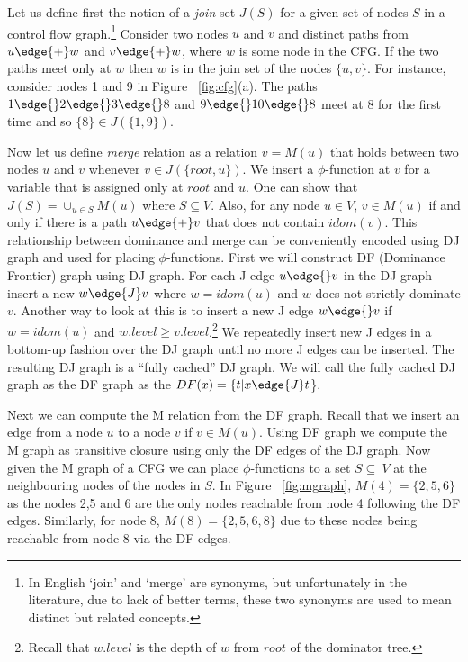 Let us define first the notion of a {\em join} set $J(S)$
 for a given set of nodes  $S$ in a control flow
graph.\footnote{In English `join' and `merge' are synonyms, 
but unfortunately
in the literature, due to lack of  better terms, these two synonyms are used to mean
distinct but related concepts.} Consider two nodes $u$ and $v$ and distinct 
paths from $u \edge{+} w$ and $v \edge{+} w$, where $w$ is some node in the CFG. If the 
two paths meet only at $w$ then $w$ is in the join set of the nodes $\{u, v\}$. 
For instance, consider nodes 1 and 9 in Figure ~\ref{fig:cfg}(a).
The paths $1 \edge{} 2 \edge{} 3 \edge{} 8$ and $9 \edge{} 10 \edge{} 8$ meet at $8$ 
for the first time and so $\{8\} \in J(\{1,9\})$. 

Now let us define {\em merge} relation as a relation $v=M(u)$
that holds between two nodes $u$ and $v$ whenever
$v \in J(\{root, u\})$. We insert a $\phi$-function at $v$ for a variable that is assigned
only at $root$ and $u$. One can show that $J(S) = \cup_{u \in S} M(u)$ where $S \subseteq V$. Also, for any node $u \in V$, $v \in M(u)$ if and only if
there is a path $u \edge{+} v$ that does not contain $idom(v)$.  This relationship between
dominance and merge can be conveniently encoded using DJ graph and used for placing 
$\phi$-functions. First we will construct DF (Dominance Frontier) graph using DJ graph.
For each J edge $u \edge{} v$ in the DJ graph insert a new  $w \edge{J} v$ where
$w = idom (u)$ and $w$ does not strictly dominate $v$. Another way to
look at this is to insert a new J edge $w \edge{} v$ if $w = idom(u)$ and
$w.level \geq v.level$.\footnote{Recall that $w.level$ is the depth of $w$ from
$root$ of the dominator tree.} We repeatedly insert new J edges in a bottom-up fashion
over the DJ graph until no more J edges can be inserted. The resulting
DJ graph is a ``fully cached'' DJ graph. We will call the fully cached
DJ graph as the DF graph as the $DF(x) = \{t| x \edge{J} t$\}.

Next we can compute the M relation from the DF graph. 
Recall that  we insert an edge from a node $u$ to
a node $v $ if $v \in M(u)$. Using DF graph we compute
the M graph as transitive closure
using only the DF edges of the DJ graph. Now given the M graph of
a CFG we can place $\phi$-functions to a set $S \subseteq \ V$ at the neighbouring nodes of the nodes in $S$. In Figure ~\ref{fig:mgraph}, $M(4) = \{2,5,6\}$ as the nodes 2,5 and 6 are the only nodes reachable from node 4 following the DF edges. Similarly, for node 8, $M(8) = \{2,5,6,8\}$ due to these nodes being reachable from node 8 via the DF edges.

